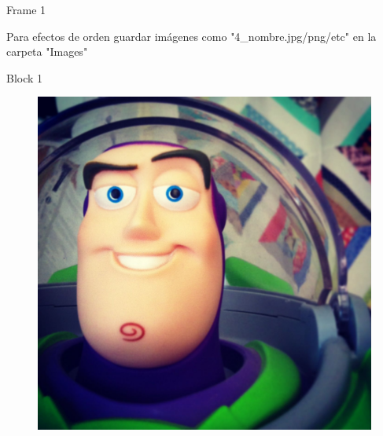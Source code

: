 \documentclass[xcolor=dvipsnames]{beamer}
\begin{document}
\begin{frame}{Frame 1}

Para efectos de orden guardar imágenes como "4\_nombre.jpg/png/etc" en la carpeta "Images"

\begin{block}{Block 1}
\cite{hobson_efstathiou_lasenby_2006}    
\end{block}

\begin{figure}
    \centering
    \includegraphics[width=0.25 \textwidth]{Presentations/Images/sample.jpg}
\end{figure}
    
\end{frame}
\end{document}
